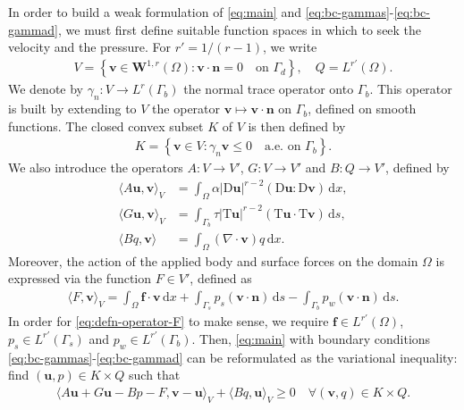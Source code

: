 \documentclass[onefignum,onetabnum]{siamart190516}
\newcommand{\bn}{\boldsymbol{n}}
\newcommand{\bu}{\boldsymbol{u}}
\newcommand{\bv}{\boldsymbol{v}}
\newcommand{\bW}{\boldsymbol{W}}
\newcommand{\bff}{\boldsymbol{f}}
\newcommand{\bT}{\boldsymbol{\mathrm{T}}}
\newcommand{\bD}{\boldsymbol{\mathrm{D}}}
\newcommand{\dd}{\mathrm{d}}
\begin{document}
In order to build a weak formulation of \eqref{eq:main} and \eqref{eq:bc-gammas}-\eqref{eq:bc-gammad}, we must first define suitable function spaces in which to seek the velocity and the pressure. For $r' = 1/(r-1)$, we write 
%
\begin{align*}
	V = \left\lbrace \bv \in \bW^{1,r}(\Omega) : \bv\cdot\bn = 0 \quad \text{on $\Gamma_d$} \right\rbrace , \quad Q = L^{r'}(\Omega).
\end{align*}
%
We denote by $\gamma_n : V \to L^r(\Gamma_b)$ the normal trace operator onto $\Gamma_b$. This operator is built by extending to $V$ the operator $\bv \mapsto \bv\cdot\bn$ on $\Gamma_b$, defined on smooth functions. The closed convex subset $K$ of $V$ is then defined by
%
\begin{align*}
	K = \left\lbrace \bv\in V : \gamma_n\bv \leq 0 \quad \text{a.e. on $\Gamma_b$} \right\rbrace.
\end{align*}
%
We also introduce the operators $A:V\to V'$, $G:V \to V'$ and $B:Q\to V'$, defined by
%
\begin{align}\label{eq:defn-operator-AB}
	\langle A\bu,\bv \rangle_V &= \int_\Omega \alpha |\bD\bu|^{r-2} \left(\bD\bu : \bD\bv\right)\,\dd x, \\
	\langle G\bu,\bv \rangle_V &= \int_{\Gamma_b} \tau |\bT\bu|^{r-2} \left(\bT\bu \cdot \bT\bv\right)\,\dd s, \\
	 \langle Bq, \bv \rangle &= \int_\Omega \left(\nabla\cdot\bv\right) q\,\dd x.
\end{align}
%
Moreover, the action of the applied body and surface forces on the domain $\Omega$ is expressed via the function $F\in V'$, defined as
%
\begin{align}\label{eq:defn-operator-F}
	\langle F, \bv \rangle_V = \int_\Omega \bff\cdot \bv\,\dd x + \int_{\Gamma_s}p_s\left( \bv\cdot\bn\right)\,\dd s - \int_{\Gamma_b}p_w\left( \bv\cdot\bn\right)\,\dd s.
\end{align}
%
In order for \eqref{eq:defn-operator-F} to make sense, we require $\bff\in L^{r'}(\Omega)$, $p_s \in L^{r'}(\Gamma_s)$ and $p_w \in L^{r'}(\Gamma_b)$. Then, \eqref{eq:main} with boundary conditions \eqref{eq:bc-gammas}-\eqref{eq:bc-gammad} can be reformulated as the variational inequality: find $(\bu,p)\in K\times Q$ such that
%
\begin{align}\label{eq:vi-continuous}
	\langle A\bu + G\bu - Bp - F, \bv - \bu \rangle_V + \langle Bq, \bu \rangle_V \geq 0 \quad \forall (\bv,q)\in K\times Q.
\end{align}
\end{document}
